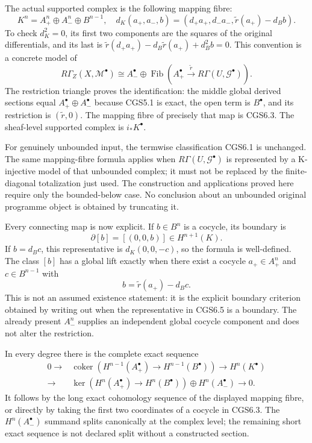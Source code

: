 The actual supported complex is the following mapping fibre: \[
 \boxed{
 K^n=A_+^n\oplus A_-^n\oplus B^{n-1},\quad
 d_K(a_+,a_-,b)
 =(d_+a_+,d_-a_-,\widetilde r(a_+)-d_Bb).
 }
\tag{CGS6.3}
\] To check \(d_K^2=0\), its first two components are the squares of the
original differentials, and its last is
\(\widetilde r(d_+a_+)-d_B\widetilde r(a_+)+d_B^2b=0\). This convention
is a concrete model of \[
 R\Gamma_Z(X,\mathcal M^\bullet)
 \cong A_-^\bullet\oplus
 \operatorname{Fib}\!\left(A_+^\bullet
       \xrightarrow{\widetilde r}R\Gamma(U,\mathcal G^\bullet)\right).
\tag{CGS6.4}
\] The restriction triangle proves the identification: the middle global
derived sections equal \(A_+^\bullet\oplus A_-^\bullet\) because CGS5.1
is exact, the open term is \(B^\bullet\), and its restriction is
\((\widetilde r,0)\). The mapping fibre of precisely that map is CGS6.3.
The sheaf-level supported complex is \(i_*K^\bullet\).

For genuinely unbounded input, the termwise classification CGS6.1 is
unchanged. The same mapping-fibre formula applies when
\(R\Gamma(U,\mathcal G^\bullet)\) is represented by a K-injective model
of that unbounded complex; it must not be replaced by the
finite-diagonal totalization just used. The construction and
applications proved here require only the bounded-below case. No
conclusion about an unbounded original programme object is obtained by
truncating it.

Every connecting map is now explicit. If \(b\in B^n\) is a cocycle, its
boundary is \[
 \partial[b]=[(0,0,b)]\in H^{n+1}(K).
\tag{CGS6.5}
\] If \(b=d_Bc\), this representative is \(d_K(0,0,-c)\), so the formula
is well-defined. The class \([b]\) has a global lift exactly when there
exist a cocycle \(a_+\in A_+^n\) and \(c\in B^{n-1}\) with \[
 b=\widetilde r(a_+)-d_Bc.
\tag{CGS6.6}
\] This is not an assumed existence statement: it is the explicit
boundary criterion obtained by writing out when the representative in
CGS6.5 is a boundary. The already present \(A_-^n\) supplies an
independent global cocycle component and does not alter the restriction.

In every degree there is the complete exact sequence \[
 \begin{aligned}
 0\longrightarrow&
 \operatorname{coker}\!\left(
 H^{n-1}(A_+^\bullet)\to H^{n-1}(B^\bullet)\right)
 \longrightarrow H^n(K^\bullet)\\
 \longrightarrow&
 \ker\!\left(H^n(A_+^\bullet)\to H^n(B^\bullet)\right)
 \oplus H^n(A_-^\bullet)\longrightarrow0 .
 \end{aligned}
\tag{CGS6.7}
\] It follows by the long exact cohomology sequence of the displayed
mapping fibre, or directly by taking the first two coordinates of a
cocycle in CGS6.3. The \(H^n(A_-^\bullet)\) summand splits canonically
at the complex level; the remaining short exact sequence is not declared
split without a constructed section.

